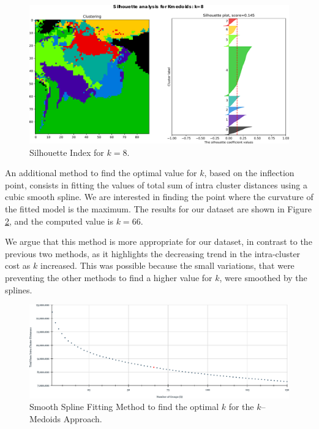 \begin{figure}[h]
	\centering
	\includegraphics[scale=0.50]{../Figures/silhouette-kmedoids_k8_seed0_lite}
	\caption{Silhouette Index for $k=8$.}
	\label{Fig:Silhouette-kMedoids}
\end{figure}

An additional method to find the optimal value for $k$, based on the inflection point, consists in fitting the values of total sum of intra cluster distances using a cubic smooth spline. We are interested in finding the point where the curvature of the fitted model is the maximum. The results for our dataset are shown in Figure \ref{Fig:SmoothSpline-kMedoids}, and the computed value is $k = 66$.

We argue that this method is more appropriate for our dataset, in contrast to the previous two methods, as it highlights the decreasing trend in the intra-cluster cost as $k$ increased. This was possible because the small variations, that were preventing the other methods to find a higher value for $k$, were smoothed by the splines.

\begin{figure}[h]
	\centering
	\includegraphics[scale=0.5]{../Figures/SmoothSpline-kMedoids}
	\caption{Smooth Spline Fitting Method to find the optimal $k$ for the $k$--Medoids Approach.}
	\label{Fig:SmoothSpline-kMedoids}
\end{figure}

